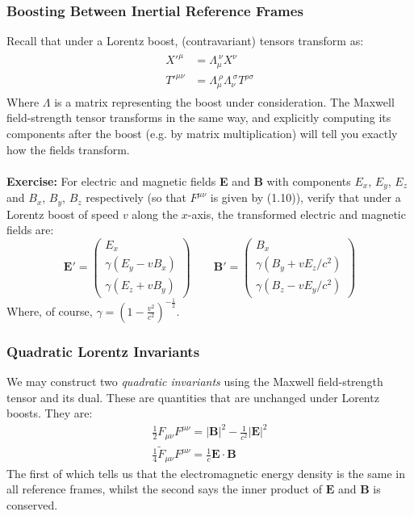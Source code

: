 \documentclass[a4paper]{article}
\numberwithin{equation}{section}
\begin{document}
\subsubsection{Boosting Between Inertial Reference Frames}
Recall that under a Lorentz boost, (contravariant) tensors transform as:
\begin{align}
\begin{split}
X'^\mu &= \Lambda _\mu^{ \ \nu} X^\nu \\
T'^{\mu \nu} &= \Lambda_\mu^{\ \rho} \Lambda_\nu^{\ \sigma} T^{\rho \sigma}
\end{split}
\end{align}
Where $\Lambda$ is a matrix representing the boost under consideration. The Maxwell field-strength tensor transforms in the same way, and explicitly computing its components after the boost (e.g. by matrix multiplication) will tell you exactly how the fields transform.\\
\\
\textbf{Exercise:} For electric and magnetic fields \textbf{E} and \textbf{B} with components $E_x$, $E_y$, $E_z$ and $B_x$, $B_y$, $B_z$ respectively (so that $F^{\mu \nu}$ is given by (1.10)), verify that under a Lorentz boost of speed $v$ along the $x$-axis, the transformed electric and magnetic fields are:
\begin{equation*}
\mathbf{E'}= \begin{pmatrix}
E_x \\
\gamma(E_y - vB_x) \\
\gamma(E_z+vB_y)
\end{pmatrix}
\qquad
\mathbf{B'} = \begin{pmatrix}
B_x \\
\gamma(B_y + vE_z/c^2) \\
\gamma(B_z-vE_y/c^2)
\end{pmatrix}
\end{equation*}
Where, of course, $\gamma = (1-\frac{v^2}{c^2})^{-\frac{1}{2}}$.
\subsubsection{Quadratic Lorentz Invariants}
We may construct two \textit{quadratic invariants} using the Maxwell field-strength tensor and its dual. These are quantities that are unchanged under Lorentz boosts. They are:
\begin{align}
\frac{1}{2}F_{\mu \nu}F^{\mu \nu} = |\mathbf{B}|^2-\frac{1}{c^2}|\mathbf{E}|^2 \\
\frac{1}{4}\tilde{F}_{\mu \nu} F^{ \mu \nu} = \frac{1}{c} \mathbf{E} \cdot \mathbf{B}
\end{align}
The first of which tells us that the electromagnetic energy density is the same in all reference frames, whilst the second says the inner product of $\mathbf{E}$ and $\mathbf{B}$ is conserved.
\end{document}
